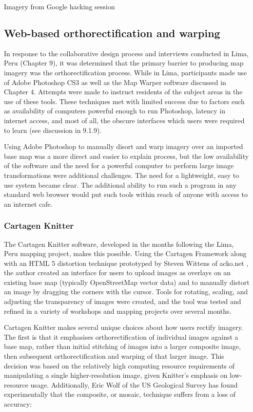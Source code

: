 \documentclass[11pt]{report}
\begin{document}
Imagery from Google hacking session

\subsection{Web-based orthorectification and warping}

In response to the collaborative design process and interviews conducted in Lima, Peru (Chapter 9), it was determined that the primary barrier to producing map imagery was the orthorectification process. While in Lima, participants made use of Adobe Photoshop CS3 as well as the Map Warper software discussed in Chapter 4. Attempts were made to instruct residents of the subject areas in the use of these tools. These techniques met with limited success due to factors such as availability of computers powerful enough to run Photoshop, latency in internet access, and most of all, the obscure interfaces which users were required to learn (see discussion in 9.1.9).  

Using Adobe Photoshop to manually disort and warp imagery over an imported base map was a more direct and easier to explain process, but the low availability of the software and the need for a powerful computer to perform large image transformations were additional challenges. The need for a lightweight, easy to use system became clear. The additional ability to run such a program in any standard web browser would put such tools within reach of anyone with access to an internet cafe.

\subsubsection{Cartagen Knitter}

The Cartagen Knitter software, developed in the months following the Lima, Peru mapping project, makes this possible. Using the Cartagen Framework along with an HTML 5 distortion technique prototyped by Steven Wittens of acko.net \cite{wittens2008projective}, the author created an interface for users to upload images as overlays on an existing base map (typically OpenStreetMap vector data) and to manually distort an image by dragging the corners with the cursor. Tools for rotating, scaling, and adjusting the transparency of images were created, and the tool was tested and refined in a variety of workshops and mapping projects over several months. 

Cartagen Knitter makes several unique choices about how users rectify imagery. The first is that it emphasises orthorectification of individual images against a base map, rather than initial stitching of images into a larger composite image, then subsequent orthorectification and warping of that larger image. This decision was based on the relatively high computing resource requirements of manipulating a single higher-resolution image, given Knitter's emphasis on low-resource usage. Additionally, Eric Wolf of the US Geological Survey has found experimentally that the composite, or mosaic, technique suffers from a loss of accuracy: 
\end{document}
